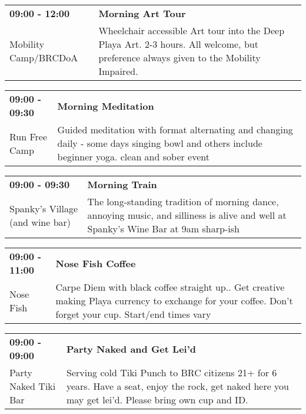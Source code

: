 \begin{tabular}{ p{1in} p{2.2in} }
    \textbf{09:00 - 12:00} & \textbf{Morning Art Tour} \\
    Mobility Camp/BRCDoA \newline  & Wheelchair accessible Art tour into the Deep Playa Art.
2-3 hours. All welcome, but preference always given to the Mobility Impaired. \\
    \hline 
\end{tabular}
    
\begin{tabular}{ p{1in} p{2.2in} }
    \textbf{09:00 - 09:30} & \textbf{Morning Meditation} \\
    Run Free Camp \newline  & Guided meditation with format alternating and changing daily - some days singing bowl and others include beginner yoga. clean and sober event \\
    \hline 
\end{tabular}
    
\begin{tabular}{ p{1in} p{2.2in} }
    \textbf{09:00 - 09:30} & \textbf{Morning Train} \\
    Spanky's Village (and wine bar) \newline  & The long-standing tradition of morning dance, annoying music, and silliness is alive and well at Spanky's Wine Bar at 9am sharp-ish \\
    \hline 
\end{tabular}
    
\begin{tabular}{ p{1in} p{2.2in} }
    \textbf{09:00 - 11:00} & \textbf{Nose Fish Coffee} \\
    Nose Fish \newline  & Carpe Diem with black coffee straight up.. Get creative making Playa currency to exchange for your coffee. Don't forget your cup. Start/end times vary \\
    \hline 
\end{tabular}
    
\begin{tabular}{ p{1in} p{2.2in} }
    \textbf{09:00 - 09:00} & \textbf{Party Naked and Get Lei'd} \\
    Party Naked Tiki Bar \newline  & Serving cold Tiki Punch to BRC citizens 21+ for 6 years. Have a seat, enjoy the rock, get naked here you may get lei'd. Please bring own cup and ID. \\
    \hline 
\end{tabular}
    
